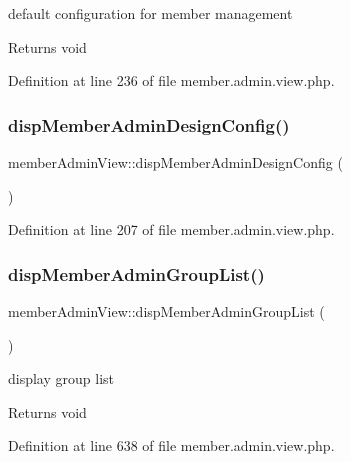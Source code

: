 default configuration for member management

\begin{DoxyReturn}{Returns}
void 
\end{DoxyReturn}


Definition at line 236 of file member.\+admin.\+view.\+php.

\mbox{\label{classmemberAdminView_ab9f3ed7d905d09ea8ad49acdc22fe326}} 
\subsubsection{\texorpdfstring{disp\+Member\+Admin\+Design\+Config()}{dispMemberAdminDesignConfig()}}
{\footnotesize\ttfamily member\+Admin\+View\+::disp\+Member\+Admin\+Design\+Config (\begin{DoxyParamCaption}{ }\end{DoxyParamCaption})}



Definition at line 207 of file member.\+admin.\+view.\+php.

\mbox{\label{classmemberAdminView_a4a1e4b416515bdcdb1459f44398eb412}} 
\subsubsection{\texorpdfstring{disp\+Member\+Admin\+Group\+List()}{dispMemberAdminGroupList()}}
{\footnotesize\ttfamily member\+Admin\+View\+::disp\+Member\+Admin\+Group\+List (\begin{DoxyParamCaption}{ }\end{DoxyParamCaption})}

display group list

\begin{DoxyReturn}{Returns}
void 
\end{DoxyReturn}


Definition at line 638 of file member.\+admin.\+view.\+php.

